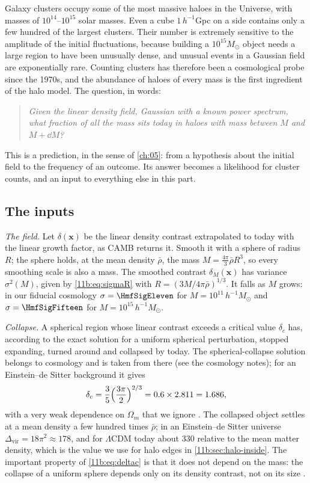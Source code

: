 Galaxy clusters occupy some of the most massive haloes in the Universe,
with masses of $10^{14}$--$10^{15}$ solar masses. Even a cube
$1\,h^{-1}$Gpc on a side contains only a few hundred of the largest clusters. Their number is extremely sensitive to
the amplitude of the initial fluctuations, because building a $10^{15}M_\odot$
object needs a large region to have been unusually dense, and unusual events in a
Gaussian field are exponentially rare. Counting clusters has therefore been a
cosmological probe since the 1970s, and the abundance of haloes of every mass is
the first ingredient of the halo model. The question, in words:
\begin{quote}
\emph{Given the linear density field, Gaussian with a known power spectrum, what
fraction of all the mass sits today in haloes with mass between $M$ and
$M+\dd M$?}
\end{quote}
This is a prediction, in the sense of \cref{ch:05}: from a hypothesis about the
initial field to the frequency of an outcome. Its answer becomes a likelihood for
cluster counts, and an input to everything else in this part.

\subsection{The inputs}
\label{11b:sec:hmf-inputs}

\emph{The field.} Let $\delta(\bm x)$ be the linear density contrast extrapolated
to today with the linear growth factor, as CAMB returns it. Smooth it with a
sphere of radius $R$; the sphere holds, at the mean density $\bar\rho$, the mass
$M=\tfrac{4\pi}{3}\bar\rho R^3$, so every smoothing scale is also a mass. The
smoothed contrast $\delta_M(\bm x)$ has variance $\sigma^2(M)$, given by
\eqref{11b:eq:sigmaR} with $R=(3M/4\pi\bar\rho)^{1/3}$. It falls as $M$ grows: in
our fiducial cosmology $\sigma=\HmfSigEleven$ for $M=10^{11}\,h^{-1}M_\odot$ and
$\sigma=\HmfSigFifteen$ for $M=10^{15}\,h^{-1}M_\odot$.

\emph{Collapse.} A spherical region whose linear contrast exceeds a critical value
$\delta_c$ has, according to the exact solution for a uniform spherical
perturbation, stopped expanding, turned around and collapsed by today. The
spherical-collapse solution belongs to cosmology and is taken from there (see the
cosmology notes); for an Einstein--de Sitter background it gives
\begin{equation}
  \delta_c=\frac35\Bigl(\frac{3\pi}{2}\Bigr)^{2/3}
  =0.6\times2.811=1.686,
  \label{11b:eq:deltac}
\end{equation}
with a very weak dependence on $\Omega_m$ that we ignore
. The collapsed object settles at a mean
density a few hundred times $\bar\rho$; in an Einstein--de Sitter universe
$\Delta_{\mathrm{vir}}=18\pi^2\approx178$, and for $\Lambda$CDM today about $330$
relative to the mean matter density, which is the value we use for halo edges in
\cref{11b:sec:halo-inside}. The important property of \eqref{11b:eq:deltac} is
that it does not depend on the mass: the collapse of a uniform sphere depends only
on its density contrast, not on its size .

